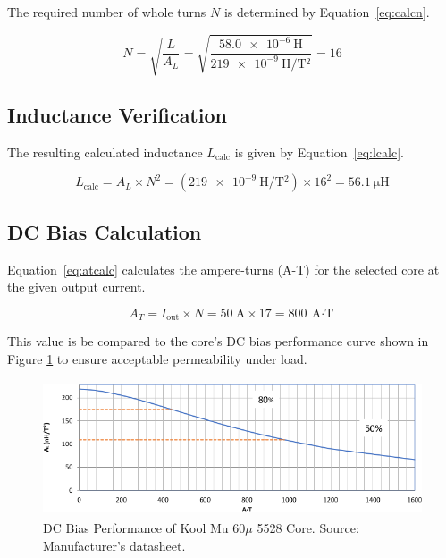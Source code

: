 \documentclass{article}
\begin{document}
The required number of whole turns \( N \) is determined by Equation~\eqref{eq:calcn}.

\begin{equation}
\label{eq:calcn}
    N = \sqrt{\frac{L}{A_L}} = \sqrt{\frac{\SI{58.0e-6}{\henry}}{\SI{219e-9}{\henry\per\tesla^2}}} = \num{16}
\end{equation}

\subsection{Inductance Verification}

The resulting calculated inductance \( L_\text{calc} \) is given by Equation~\eqref{eq:lcalc}.

\begin{equation}
\label{eq:lcalc}
    L_{\text{calc}} = A_L \times N^2 = (\SI{219e-9}{\henry\per\tesla^2}) \times \num{16}^2 = \SI{56.1}{\micro\henry}
\end{equation}

\subsection{DC Bias Calculation}

Equation~\eqref{eq:atcalc} calculates the ampere-turns (A-T) for the selected core at the given output current.

\begin{equation}
\label{eq:atcalc}
    A_T = I_{\text{out}} \times N = \SI{50}{\ampere} \times \num{17} = \SI{800}{\ampere\cdot\text{T}}
\end{equation}

This value is be compared to the core's DC bias performance curve shown in Figure \ref{fig:dcbias_5528} to ensure acceptable permeability under load. \\

\begin{figure}[H]
    \centering
    \includegraphics[height=4cm]{00K5528E060_dcbias_notitle.png}
    \caption{DC Bias Performance of Kool Mu $60\mu$ 5528 Core. Source: Manufacturer's datasheet.}
    \label{fig:dcbias_5528}
\end{figure}
\end{document}
